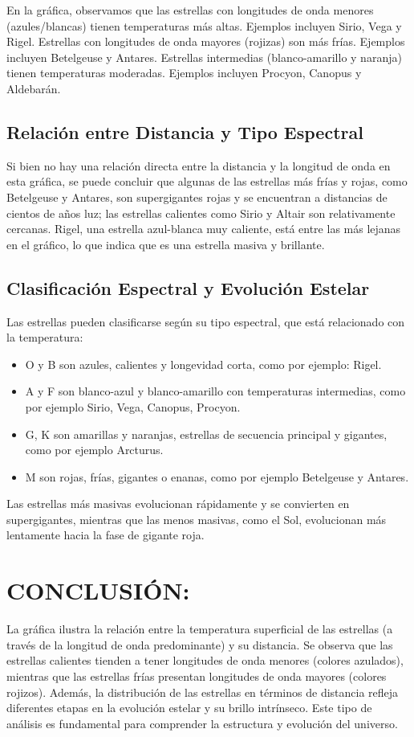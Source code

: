 \documentclass{article}
\begin{document}
En la gráfica, observamos que las estrellas con longitudes de onda menores (azules/blancas) tienen temperaturas más altas. Ejemplos incluyen Sirio, Vega y Rigel. Estrellas con longitudes de onda mayores (rojizas) son más frías. Ejemplos incluyen Betelgeuse y Antares. Estrellas intermedias (blanco-amarillo y naranja) tienen temperaturas moderadas. Ejemplos incluyen Procyon, Canopus y Aldebarán.

\subsection{Relación entre Distancia y Tipo Espectral} 

Si bien no hay una relación directa entre la distancia y la longitud de onda en esta gráfica, se puede concluir que algunas de las estrellas más frías y rojas, como Betelgeuse y Antares, son supergigantes rojas y se encuentran a distancias de cientos de años luz; las estrellas calientes como Sirio y Altair son relativamente cercanas. Rigel, una estrella azul-blanca muy caliente, está entre las más lejanas en el gráfico, lo que indica que es una estrella masiva y brillante.

\subsection{Clasificación Espectral y Evolución Estelar}

Las estrellas pueden clasificarse según su tipo espectral, que está relacionado con la temperatura:

\begin{itemize}
    \item O y B son azules, calientes y longevidad corta, como por ejemplo: Rigel.
    \item A y F son blanco-azul y blanco-amarillo con  temperaturas intermedias, como por ejemplo  Sirio, Vega, Canopus, Procyon.
    \item G, K son amarillas y naranjas, estrellas de secuencia principal y gigantes, como por ejemplo Arcturus.
    \item M son rojas, frías, gigantes o enanas, como por ejemplo Betelgeuse y Antares.
\end{itemize}

Las estrellas más masivas evolucionan rápidamente y se convierten en supergigantes, mientras que las menos masivas, como el Sol, evolucionan más lentamente hacia la fase de gigante roja.

\section{CONCLUSIÓN:}

La gráfica ilustra la relación entre la temperatura superficial de las estrellas (a través de la longitud de onda predominante) y su distancia. Se observa que las estrellas calientes tienden a tener longitudes de onda menores (colores azulados), mientras que las estrellas frías presentan longitudes de onda mayores (colores rojizos). Además, la distribución de las estrellas en términos de distancia refleja diferentes etapas en la evolución estelar y su brillo intrínseco. Este tipo de análisis es fundamental para comprender la estructura y evolución del universo.
\end{document}
